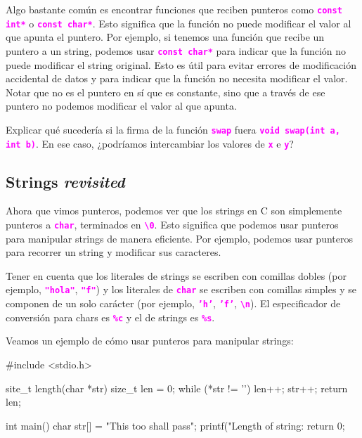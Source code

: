 \documentclass[]{scrartcl}
\newcommand{\hl}[1]{\textcolor{magenta}{\textbf{\texttt{#1}}}}
\begin{document}
Algo bastante común es encontrar funciones que reciben punteros como \hl{const int*} o \hl{const char*}. Esto significa que la función no puede modificar el valor al que apunta el puntero. Por ejemplo, si tenemos una función que recibe un puntero a un string, podemos usar \hl{const char*} para indicar que la función no puede modificar el string original.
Esto es útil para evitar errores de modificación accidental de datos y para indicar que la función no necesita modificar el valor. Notar que no es el puntero en sí que es constante, sino que a través de ese puntero no podemos modificar el valor al que apunta. 

\begin{exbox}
Explicar qué sucedería si la firma de la función \hl{swap} fuera \hl{void swap(int a, int b)}. En ese caso, ¿podríamos intercambiar los valores de \hl{x} e \hl{y}? 
\end{exbox}

\subsection*{Strings \textit{revisited}}

Ahora que vimos punteros, podemos ver que los strings en C son simplemente punteros a \hl{char}, terminados en \hl{\textquotesingle\textbackslash0\textquotesingle}.
Esto significa que podemos usar punteros para manipular strings de manera eficiente. Por ejemplo, podemos usar punteros para recorrer un string y modificar sus caracteres.

Tener en cuenta que los literales de strings se escriben con comillas dobles (por ejemplo, \hl{"hola"}, \hl{"f"}) y los literales de \hl{char} se escriben con comillas simples y se componen de un solo carácter (por ejemplo, \hl{'h'}, \hl{'f'}, \hl{\textquotesingle\textbackslash n\textquotesingle}).
El especificador de conversión para chars es \hl{\%c} y el de strings es \hl{\%s}. 

Veamos un ejemplo de cómo usar punteros para manipular strings:

\begin{cbox}[]{}
  #include <stdio.h>

  site_t length(char *str) {
      size_t len = 0;
      while (*str != '\0') {
          len++;
          str++;
      }
      return len;
  }

  int main() {
      char str[] = "This too shall pass";
      printf("Length of string: %
    return 0;
  }
\end{cbox}
\end{document}

